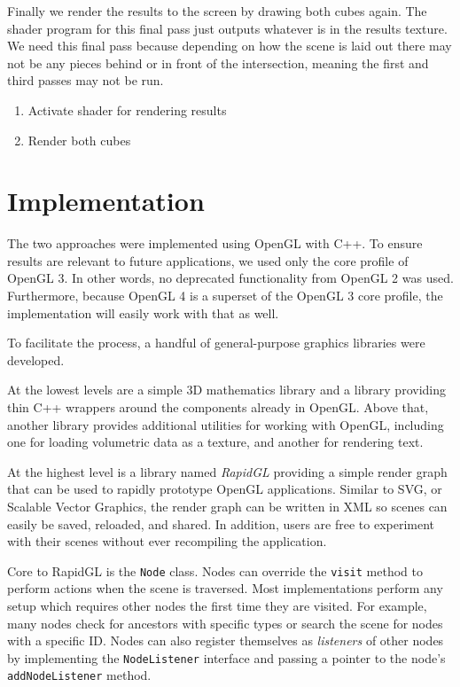 \documentclass{report}
\begin{document}
Finally we render the results to the screen by drawing both cubes again.  The
shader program for this final pass just outputs whatever is in the results
texture.  We need this final pass because depending on how the scene is laid out
there may not be any pieces behind or in front of the intersection, meaning the
first and third passes may not be run.

\begin{enumerate}
  \item Activate shader for rendering results
  \item Render both cubes
\end{enumerate}

\chapter{Implementation}

The two approaches were implemented using OpenGL with C++.  To ensure results
are relevant to future applications, we used only the core profile of OpenGL 3.
In other words, no deprecated functionality from OpenGL 2 was used.
Furthermore, because OpenGL 4 is a superset of the OpenGL 3 core profile, the
implementation will easily work with that as well.

To facilitate the process, a handful of general-purpose graphics libraries were
developed.

At the lowest levels are a simple 3D mathematics library and a library providing
thin C++ wrappers around the components already in OpenGL.  Above that, another
library provides additional utilities for working with OpenGL, including one for
loading volumetric data as a texture, and another for rendering text.

At the highest level is a library named {\em RapidGL} providing a simple render
graph that can be used to rapidly prototype OpenGL applications.  Similar to
SVG, or Scalable Vector Graphics, the render graph can be written in XML so
scenes can easily be saved, reloaded, and shared.  In addition, users are free
to experiment with their scenes without ever recompiling the application.

Core to RapidGL is the {\tt Node} class.  Nodes can override the {\tt visit}
method to perform actions when the scene is traversed.  Most implementations
perform any setup which requires other nodes the first time they are visited.
For example, many nodes check for ancestors with specific types or search the
scene for nodes with a specific ID.  Nodes can also register themselves as {\em
listeners} of other nodes by implementing the {\tt NodeListener} interface and
passing a pointer to the node's {\tt addNodeListener} method.
\end{document}
